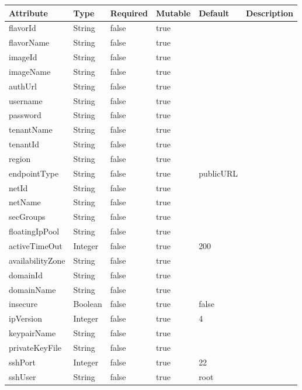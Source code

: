 \begin{itemize}
\begin{tabularx}{\textwidth}{|l|l|p{1.4cm}|p{1.3cm}|l|X|}
  \hline
  \textbf{Attribute} & \textbf{Type} & \textbf{Required} & \textbf{Mutable} & \textbf{Default} & \textbf{Description} \\
  \hline  
  flavorId & String & false & true &  &  \\
  \hline
  flavorName & String & false & true &  &  \\
  \hline
  imageId & String & false & true &  &  \\
  \hline
  imageName & String & false & true &  &  \\
  \hline
  authUrl & String & false & true &  &  \\
  \hline
  username & String & false & true &  &  \\
  \hline
  password & String & false & true &  &  \\
  \hline
  tenantName & String & false & true &  &  \\
  \hline
  tenantId & String & false & true &  &  \\
  \hline
  region & String & false & true &  &  \\
  \hline
  endpointType & String & false & true & publicURL &  \\
  \hline
  netId & String & false & true &  &  \\
  \hline
  netName & String & false & true &  &  \\
  \hline
  secGroups & String & false & true &  &  \\
  \hline
  floatingIpPool & String & false & true &  &  \\
  \hline
  activeTimeOut & Integer & false & true & 200 &  \\
  \hline
  availabilityZone & String & false & true &  &  \\
  \hline
  domainId & String & false & true &  &  \\
  \hline
  domainName & String & false & true &  &  \\
  \hline
  insecure & Boolean & false & true & false &  \\
  \hline
  ipVersion & Integer & false & true & 4 &  \\
  \hline
  keypairName & String & false & true &  &  \\
  \hline
  privateKeyFile & String & false & true &  &  \\
  \hline
  sshPort & Integer & false & true & 22 &  \\
  \hline
  sshUser & String & false & true & root &  \\
  \hline
\end{tabularx}
\end{itemize}



